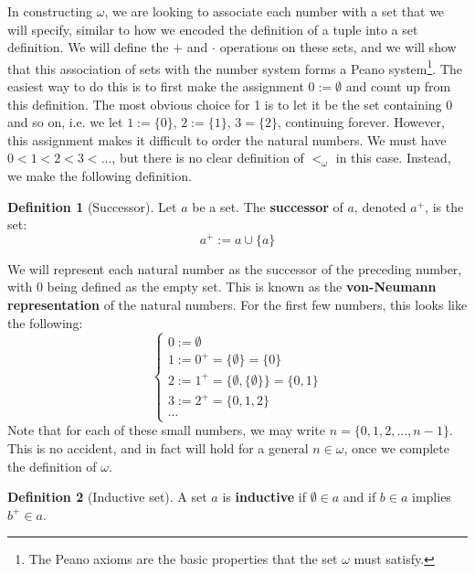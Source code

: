 \documentclass[11pt, oneside]{article}   	%
\theoremstyle{definition}
\newtheorem{definition}{Definition}[section]
\begin{document}
In constructing $\omega$, we are looking to associate each number with a set that we will specify, similar to how we 
encoded the definition of a tuple into a set definition. We will define the $+$ and 
$\cdot$ operations on these sets, and we will show that this association of sets with the number system forms a Peano 
system\footnote{The Peano axioms are the basic properties that the set $\omega$ must satisfy.}. The easiest way to 
do this is to first make the assignment $0 := \emptyset$ and count up from this definition. The most obvious choice for 
1 is to let it be the set containing 0 and so on, i.e. we let $1 := \{0\}$, $2 := \{1\}$, $3 = \{2\}$, continuing forever. However, 
this assignment makes it difficult to order the natural numbers. We must have $0 < 1 < 2 < 3 < ...$, but there is no clear 
definition of $<_\omega$ in this case. Instead, we make the following definition.

\begin{definition}[Successor]
	Let $a$ be a set. The \textbf{successor} of $a$, denoted $a^+$, is the set:
	\begin{equation}
		a^+ := a\cup\{a\}
	\end{equation}
\end{definition}

We will represent each natural number as the successor of the preceding number, with 0 being defined as the empty set. 
This is known as the \textbf{von-Neumann representation} of the natural numbers. For the first few numbers, this looks like the 
following:
\begin{equation}
\begin{cases}
	0 := \emptyset \\
	1 := 0^+ = \{\emptyset\} = \{0\} \\
	2 := 1^+ = \{\emptyset, \{\emptyset\}\} = \{0, 1\} \\
	3 := 2^+ = \{0, 1, 2\} \\
	\cdots
\end{cases}
\end{equation}
Note that for each of these small numbers, we may write $n = \{0, 1, 2, ..., n - 1\}$. This is no accident, and in fact will hold for 
a general $n\in\omega$, once we complete the definition of $\omega$. 

\begin{definition}[Inductive set]
	A set $a$ is \textbf{inductive} if $\emptyset\in a$ and if $b\in a$ implies $b^+\in a$. 
\end{definition}
\end{document}
